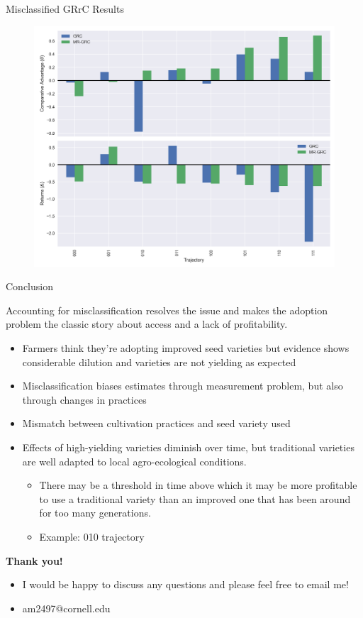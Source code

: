 \documentclass{beamer}
\begin{document}
\begin{frame}{Misclassified GRrC Results}

\begin{figure}
    \centering
    \includegraphics[scale=0.4]{results/figures/mr-theta.png}
\end{figure}
\end{frame}

\begin{frame}{Conclusion}

Accounting for misclassification resolves the issue and makes the adoption problem the classic story about access and a lack of profitability.

\begin{itemize}
    \item Farmers think they're adopting improved seed varieties but evidence shows considerable dilution and varieties are not yielding as expected
    \item Misclassification biases estimates through measurement problem, but also through changes in practices
    \item Mismatch between cultivation practices and seed variety used
    \item Effects of high-yielding varieties diminish over time, but traditional varieties are well adapted to local agro-ecological conditions.
    \begin{itemize}
    \item There may be a threshold in time above which it may be more profitable to use a traditional variety than an improved one that has been around for too many generations.
    \item Example: 010 trajectory
\end{itemize}
\end{itemize}

\end{frame}

\begin{frame}
\textbf{Thank you!}

\begin{itemize}
    \item I would be happy to discuss any questions and please feel free to email me!
    \item am2497@cornell.edu
\end{itemize}


    
\end{frame}


\end{document}
